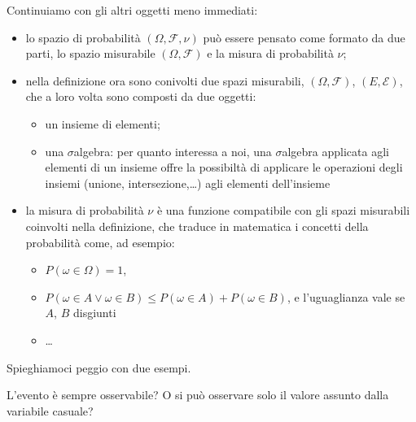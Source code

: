 \documentclass[letterpaper,10pt,italian]{jupyterBook}
\begin{document}
\sphinxAtStartPar
Continuiamo con gli altri oggetti meno immediati:
\begin{itemize}
\item {} 
\sphinxAtStartPar
lo spazio di probabilità \((\Omega, \mathcal{F}, \nu)\) può essere pensato come formato da due parti, lo spazio misurabile \((\Omega, \mathcal{F})\) e la misura di probabilità \(\nu\);

\item {} 
\sphinxAtStartPar
nella definizione ora sono conivolti due spazi misurabili, \((\Omega, \mathcal{F})\), \((E, \mathcal{E})\), che a loro volta sono composti da due oggetti:
\begin{itemize}
\item {} 
\sphinxAtStartPar
un insieme di elementi;

\item {} 
\sphinxAtStartPar
una \(\sigma\)\sphinxhyphen{}algebra: per quanto interessa a noi, una \(\sigma\)\sphinxhyphen{}algebra applicata agli elementi di un insieme offre la possibiltà di applicare le operazioni degli insiemi (unione, intersezione,…) agli elementi dell’insieme

\end{itemize}

\item {} 
\sphinxAtStartPar
la misura di probabilità \(\nu\) è una funzione compatibile con gli spazi misurabili coinvolti nella definizione, che traduce in matematica i concetti della probabilità come, ad esempio:
\begin{itemize}
\item {} 
\sphinxAtStartPar
\(P(\omega \in \Omega) = 1\),

\item {} 
\sphinxAtStartPar
\(P(\omega \in A \lor \omega \in B) \le P(\omega \in A) + P(\omega \in B)\), e l’uguaglianza vale se \(A\), \(B\) disgiunti

\item {} 
\sphinxAtStartPar
…

\end{itemize}

\end{itemize}

\sphinxAtStartPar
Spieghiamoci peggio con due esempi.

\sphinxAtStartPar
{} L’evento è sempre osservabile? O si può osservare solo il valore assunto dalla variabile casuale?
\end{document}
